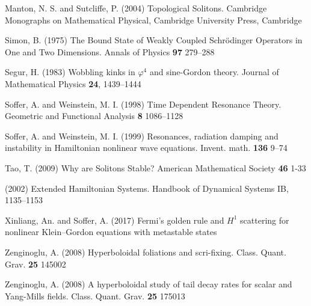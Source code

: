 \begin{thebibliography}{}
 Manton, N. S. and Sutcliffe, P. (2004)
Topological Solitons. Cambridge Monographs on Mathematical Physical, Cambridge University Press, Cambridge

 Simon, B. (1975)
The Bound State of Weakly Coupled Schr\"odinger Operators in One and Two Dimensions. Annals of Physics {\bf 97} 279--288

 Segur, H. (1983)
Wobbling kinks in $\varphi^4$ and sine-Gordon theory. Journal of Mathematical Physics {\bf 24}, 1439--1444

 Soffer, A. and Weinstein, M. I. (1998)
Time Dependent Resonance Theory. Geometric and Functional Analysis {\bf 8} 1086--1128

 Soffer, A. and Weinstein, M. I. (1999)
Resonances, radiation damping and instability in Hamiltonian nonlinear wave equations. Invent. math. {\bf 136} 9--74

 Tao, T. (2009)
Why are Solitons Stable? American Mathematical Society {\bf 46} 1-33

 (2002)
Extended Hamiltonian Systems. Handbook of Dynamical Systems IB, 1135--1153

 Xinliang, An. and Soffer, A. (2017)
Fermi's golden rule and $H^1$ scattering for nonlinear Klein--Gordon equations with metastable states

 Zenginoglu, A. (2008)
Hyperboloidal foliations and scri-fixing. Class. Quant. Grav. {\bf 25} 145002

 Zenginoglu, A. (2008)
A hyperboloidal study of tail decay rates for scalar and Yang-Mills fields. Class. Quant. Grav. {\bf 25} 175013





\end{thebibliography}